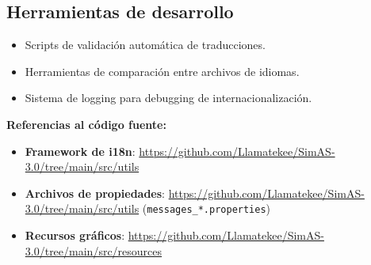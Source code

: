 \subsection{Herramientas de desarrollo}

\begin{itemize}
    \item Scripts de validación automática de traducciones.
    \item Herramientas de comparación entre archivos de idiomas.
    \item Sistema de logging para debugging de internacionalización.
\end{itemize}

\textbf{Referencias al código fuente:}

\begin{itemize}
    \item \textbf{Framework de i18n}: \url{https://github.com/Llamatekee/SimAS-3.0/tree/main/src/utils}
    \item \textbf{Archivos de propiedades}: \url{https://github.com/Llamatekee/SimAS-3.0/tree/main/src/utils} (\verb|messages_*.properties|)
    \item \textbf{Recursos gráficos}: \url{https://github.com/Llamatekee/SimAS-3.0/tree/main/src/resources}
\end{itemize}
